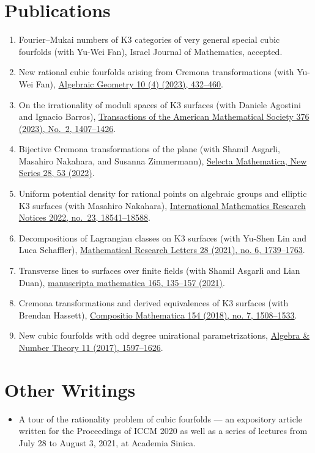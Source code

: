 \documentclass[12pt]{article}
\begin{document}
\section*{Publications}
\begin{enumerate}[leftmargin=!, itemsep=0pt]
	\item Fourier--Mukai numbers of K3 categories of very general special cubic fourfolds (with Yu-Wei Fan), Israel Journal of Mathematics, accepted.
	\item New rational cubic fourfolds arising from Cremona transformations (with Yu-Wei Fan), \href{https://doi.org/10.14231/AG-2023-014}{Algebraic Geometry 10 (4) (2023), 432--460}.
	\item On the irrationality of moduli spaces of K3 surfaces (with Daniele Agostini and Ignacio Barros), \href{https://doi.org/10.1090/tran/8830}{Transactions of the American Mathematical Society 376 (2023), No.~2, 1407--1426}.
	\item Bijective Cremona transformations of the plane (with Shamil Asgarli, Masahiro Nakahara, and Susanna Zimmermann), \href{https://doi.org/10.1007/s00029-022-00768-0}{Selecta Mathematica, New Series 28, 53 (2022)}.
	\item Uniform potential density for rational points on algebraic groups and elliptic K3 surfaces (with Masahiro Nakahara), \href{https://doi.org/10.1093/imrn/rnab237}{International Mathematics Research Notices 2022, no.~23, 18541--18588}.
	\item Decompositions of Lagrangian classes on K3 surfaces (with Yu-Shen Lin and Luca Schaffler), \href{https://dx.doi.org/10.4310/MRL.2021.v28.n6.a5}{Mathematical Research Letters 28 (2021), no. 6, 1739--1763}.
	\item Transverse lines to surfaces over finite fields (with Shamil Asgarli and Lian Duan), \href{https://doi.org/10.1007/s00229-020-01200-7}{manuscripta mathematica 165, 135--157 (2021)}.
	\item Cremona transformations and derived equivalences of K3 surfaces (with Brendan Hassett), \href{https://doi.org/10.1112/S0010437X18007145}{Compositio Mathematica 154 (2018), no. 7, 1508--1533}.
	\item New cubic fourfolds with odd degree unirational parametrizations, \href{https://doi.org/10.2140/ant.2017.11.1597}{Algebra \& Number Theory 11 (2017), 1597--1626}.
\end{enumerate}


\section*{Other Writings}
\begin{itemize}[leftmargin=!, itemsep=0pt]
	\item A tour of the rationality problem of cubic fourfolds --- an expository article written for the Proceedings of ICCM 2020 as well as a series of lectures from July 28 to August 3, 2021, at Academia Sinica.
\end{itemize}
\end{document}
